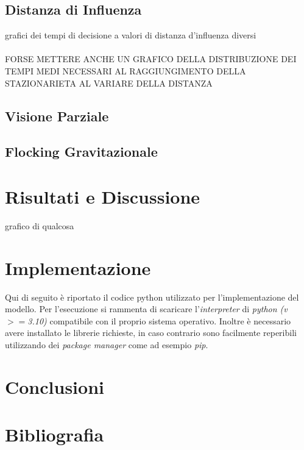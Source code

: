 \documentclass{article}
\begin{document}
\subsection{Distanza di Influenza}
\label{Sec:3.2}
grafici dei tempi di decisione a valori di distanza d'influenza diversi
\\
\\ FORSE METTERE ANCHE UN GRAFICO DELLA DISTRIBUZIONE DEI TEMPI MEDI NECESSARI AL RAGGIUNGIMENTO DELLA STAZIONARIETA AL VARIARE DELLA DISTANZA
\subsection{Visione Parziale}
\label{Sec:3.3}
\subsection{Flocking Gravitazionale}
\label{Sec:3.4}
\section{Risultati e Discussione}
\label{Sec:4}
grafico di qualcosa

\section{Implementazione}
\label{Sec:5}
Qui di seguito è riportato il codice python utilizzato per l'implementazione del modello. Per l'esecuzione si rammenta di scaricare l'\textit{interpreter} di \textit{python (v ${>=}$3.10)} compatibile con il proprio sistema operativo. Inoltre è necessario avere installato le librerie richieste, in caso contrario sono facilmente reperibili utilizzando dei \textit{package manager} come ad esempio \textit{pip}.

\section{Conclusioni}
\label{Sec:6}

\section{Bibliografia}
\label{Sec:7}
\end{document}
